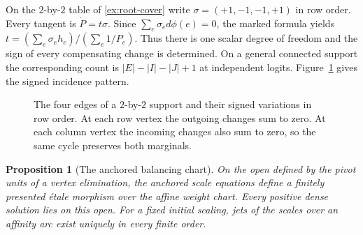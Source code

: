 \documentclass[11pt,a4paper]{article}
\newtheorem{proposition}[proposition]{Proposition}
\theoremstyle{definition}
\theoremstyle{remark}\newaliascnt{remark}{theorem}
\numberwithin{equation}{section}
\begin{document}
On the $2$-by-$2$ table of \cref{ex:root-cover} write $\sigma=(+1,-1,-1,+1)$ in row order. Every tangent is $\dot P=t\sigma$. Since $\sum_e\sigma_e d\phi(e)=0$, the marked formula yields $t=(\sum_e\sigma_e h_e)/(\sum_e1/P_e)$. Thus there is one scalar degree of freedom and the sign of every compensating change is determined. On a general connected support the corresponding count is $|E|-|I|-|J|+1$ at independent logits. Figure~\ref{fig:balanced-cycle} gives the signed incidence pattern.

\begin{figure}[!htbp]
    \centering\small
    \caption{The four edges of a $2$-by-$2$ support and their signed variations in row order. At each row vertex the outgoing changes sum to zero. At each column vertex the incoming changes also sum to zero, so the same cycle preserves both marginals.}
    \label{fig:balanced-cycle}
\end{figure}


\begin{proposition}[The anchored balancing chart]\label{prop:balanced-lift}
On the open defined by the pivot units of a vertex elimination, the anchored scale equations define a finitely presented \'etale morphism over the affine weight chart. Every positive dense solution lies on this open. For a fixed initial scaling, jets of the scales over an affinity arc exist uniquely in every finite order.
\end{proposition}
\end{document}
